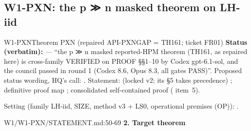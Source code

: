 \subsection{W1-PXN: the p ≫ n masked theorem on LH-iid}\label{sec:loop:pxn}
\begin{card}{W1-PXN}{Theorem PXN (repaired API-PXNGAP = TH161; ticket FR01)}
\textbf{Status (verbatim):}  — ``the p ≫ n masked reported-HPM theorem (TH161, as repaired here) is cross-family VERIFIED on PROOF §§1–10 by Codex gpt-6.1-sol, and the council passed in round 1 (Codex 8.6, Opus 8.3, all gates PASS)''. Proposed status wording, HQ's call:  . Statement:  (locked v2; its §5 takes precedence) ; definitive proof map ; consolidated self-contained proof  ( item~5).

Setting (family LH-iid, SIZE, method v3 + LS0, operational premises (OP)): .
\begin{stmt}{W1/W1-PXN/STATEMENT.md:50-69}
\textbf{2. Target theorem}


\end{stmt}
\end{card}

